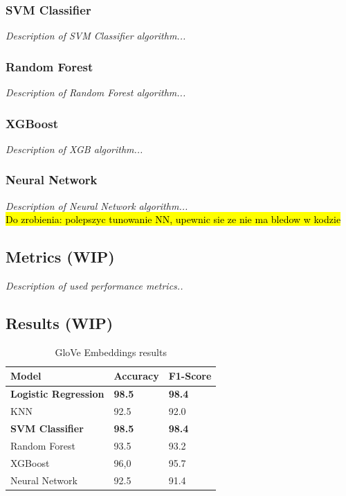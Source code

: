 \subsubsection{SVM Classifier}
\textit{Description of SVM Classifier algorithm...}

\subsubsection{Random Forest}
\textit{Description of Random Forest algorithm...}

\subsubsection{XGBoost}
\textit{Description of XGB algorithm...}

\subsubsection{Neural Network}
\textit{Description of Neural Network algorithm...}
\\
\hl{Do zrobienia: polepszyc tunowanie NN, upewnic sie ze nie ma bledow w kodzie}

\subsection{Metrics (WIP)}
\textit{Description of used performance metrics..}



\subsection{Results (WIP)}

\begin{table}[hbt!]
\begin{threeparttable}
\caption{GloVe Embeddings results}
\label{glove_embeddings_results}
\begin{tabular}{lll}
\toprule
\headrow Model & Accuracy & F1-Score\\
\midrule
 \textbf{Logistic Regression}                &       \textbf{98.5} &       \textbf{98.4} \\
 KNN               &       92.5 &       92.0   \\
 \textbf{SVM Classifier}               &       \textbf{98.5} &       \textbf{98.4} \\
 Random Forest      &       93.5 &       93.2 \\
 XGBoost           &       96,0   &       95.7 \\
 Neural Network     &       92.5 &       91.4 \\
\bottomrule
\end{tabular}
\end{threeparttable}
\end{table}

